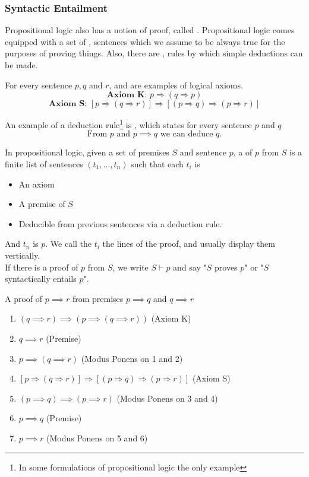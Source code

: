 \documentclass[11pt]{article}
\begin{document}
\subsubsection{Syntactic Entailment}
Propositional logic also has a notion of proof, called . Propositional logic comes equipped with a set of , sentences which we assume to be always true for the purposes of proving things. Also, there are , rules by which simple deductions can be made.
\begin{eg}
    For every sentence $p,q$ and $r$,  and  are examples of logical axioms. 
    \[\textbf{Axiom K: } p \Rightarrow (q \Rightarrow p)\]
    \[\textbf{Axiom S: }[p \Rightarrow (q \Rightarrow r)] \Rightarrow [(p \Rightarrow q) \Rightarrow (p \Rightarrow r)]\]
\end{eg}
\begin{eg}
    An example of a deduction rule\footnote{In some formulations of propositional logic the only example} is , which states for every sentence $p$ and $q$
    \[\text{From } p \text{ and } p \implies q \text{ we can deduce } q. \]
\end{eg}
\begin{defi}[Proof]
    In propositional logic, given a set of premises $S$ and sentence $p$, a  of $p$ from $S$ is a finite  list of sentences $(t_1, \dots, t_n)$ such that each $t_i$ is 
    \begin{itemize}
        \item An axiom
        \item A premise of $S$
        \item Deducible from previous sentences via a deduction rule.
    \end{itemize}
    And $t_n$ is $p$. We call the $t_i$ the lines of the proof, and usually display them vertically.
    \\If there is a proof of $p$ from $S$, we write $S \vdash p$ and say "$S$ proves $p$" or "$S$ syntactically entails $p$".
\end{defi}
\begin{eg} A proof of $p \implies r$ from premises $p \implies q$ and $q \implies r$
\begin{enumerate}
    \item $(q \implies r) \implies (p \implies (q \implies r))$ \hfill (Axiom K)
    \item $q \implies r$ \hfill (Premise)
    \item $p \implies (q \implies r)$ \hfill (Modus Ponens on 1 and 2)
    \item $[p \Rightarrow (q \Rightarrow r)] \Rightarrow [(p \Rightarrow q) \Rightarrow (p \Rightarrow r)]$ \hfill (Axiom S)
    \item $(p \implies q) \implies (p \implies r)$ \hfill (Modus Ponens on 3 and 4)
    \item $p \implies q$ \hfill (Premise)
    \item $p \implies r$ \hfill (Modus Ponens on 5 and 6)
\end{enumerate}
\end{eg}
\end{document}
